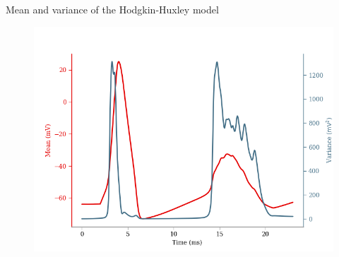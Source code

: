 \documentclass[presentation]{beamer}
\begin{document}

\begin{frame}{Mean and variance of the Hodgkin-Huxley model}
  \vspace{-5mm}
  \begin{figure}
    \includegraphics[width=1\textwidth]{hh_mean.png}
  \end{figure}

\end{frame}




\end{document}
